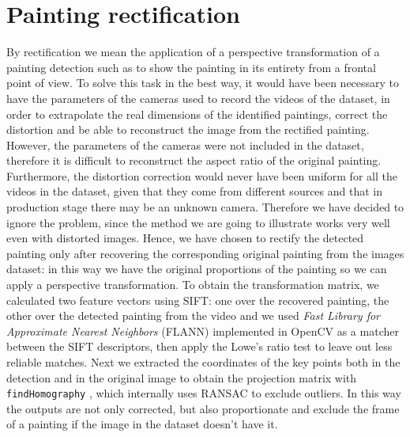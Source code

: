 \documentclass[10pt,twocolumn,letterpaper]{article}
\begin{document}
\section{Painting rectification}
\label{sec:PaintingRectification}
By rectification we mean the application of a perspective transformation of a painting detection such as to show the painting in its entirety from a frontal point of view. To solve this task in the best way, it would have been necessary to have the parameters of the cameras used to record the videos of the dataset, in order to extrapolate the real dimensions of the identified paintings, correct the distortion and be able to reconstruct the image from the rectified painting. However, the parameters of the cameras were not included in the dataset, therefore it is difficult to reconstruct the aspect ratio of the original painting. Furthermore, the distortion correction would never have been uniform for all the videos in the dataset, given that they come from different sources and that in production stage there may be an unknown camera. Therefore we have decided to ignore the problem, since the method we are going to illustrate works very well even with distorted images.
Hence, we have chosen to rectify the detected painting only after recovering the corresponding original painting from the images dataset: in this way we have the original proportions of the painting so we can apply a perspective transformation. To obtain the transformation matrix, we calculated two feature vectors using SIFT: one over the recovered painting, the other over the detected painting from the video and we used \textit{Fast Library for Approximate Nearest Neighbors} (FLANN) implemented in OpenCV as a matcher between the SIFT descriptors, then apply the Lowe's ratio test to leave out less reliable matches. Next we extracted the coordinates of the key points both in the detection and in the original image to obtain the projection matrix with \texttt{findHomography} \cite{findHomography}, which internally uses RANSAC \cite{10.1145/358669.358692} to exclude outliers. In this way the outputs are not only corrected, but also proportionate and exclude the frame of a painting if the image in the dataset doesn't have it.
\end{document}
